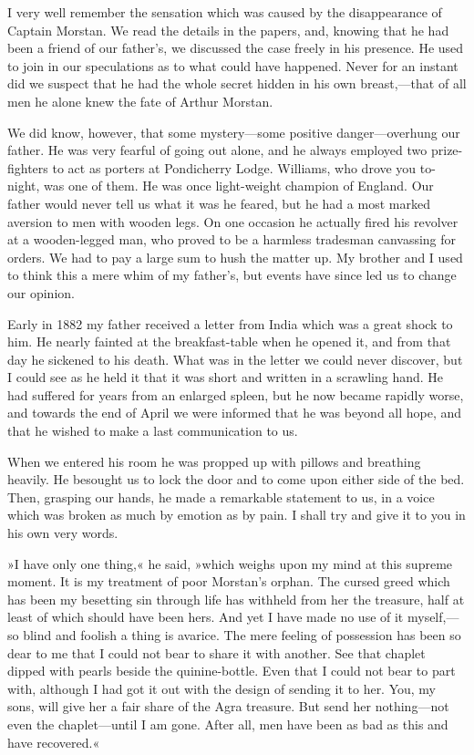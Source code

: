 I very well remember the sensation which was caused by the disappearance of Captain Morstan. We read the details in the papers, and, knowing that he had been a friend of our father's, we discussed the case freely in his presence. He used to join in our speculations as to what could have happened. Never for an instant did we suspect that he had the whole secret hidden in his own breast,—that of all men he alone knew the fate of Arthur Morstan.

We did know, however, that some mystery—some positive danger—overhung our father. He was very fearful of going out alone, and he always employed two prize-fighters to act as porters at Pondicherry Lodge. Williams, who drove you to-night, was one of them. He was once light-weight champion of England. Our father would never tell us what it was he feared, but he had a most marked aversion to men with wooden legs. On one occasion he actually fired his revolver at a wooden-legged man, who proved to be a harmless tradesman canvassing for orders. We had to pay a large sum to hush the matter up. My brother and I used to think this a mere whim of my father's, but events have since led us to change our opinion.

Early in 1882 my father received a letter from India which was a great shock to him. He nearly fainted at the breakfast-table when he opened it, and from that day he sickened to his death. What was in the letter we could never discover, but I could see as he held it that it was short and written in a scrawling hand. He had suffered for years from an enlarged spleen, but he now became rapidly worse, and towards the end of April we were informed that he was beyond all hope, and that he wished to make a last communication to us.

When we entered his room he was propped up with pillows and breathing heavily. He besought us to lock the door and to come upon either side of the bed. Then, grasping our hands, he made a remarkable statement to us, in a voice which was broken as much by emotion as by pain. I shall try and give it to you in his own very words.

»I have only one thing,« he said, »which weighs upon my mind at this supreme moment. It is my treatment of poor Morstan's orphan. The cursed greed which has been my besetting sin through life has withheld from her the treasure, half at least of which should have been hers. And yet I have made no use of it myself,—so blind and foolish a thing is avarice. The mere feeling of possession has been so dear to me that I could not bear to share it with another. See that chaplet dipped with pearls beside the quinine-bottle. Even that I could not bear to part with, although I had got it out with the design of sending it to her. You, my sons, will give her a fair share of the Agra treasure. But send her nothing—not even the chaplet—until I am gone. After all, men have been as bad as this and have recovered.«

